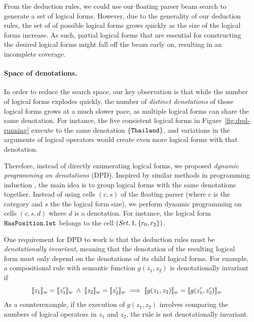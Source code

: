From the deduction rules,
we could use our floating parser beam search to generate a set
of logical forms.
However, due to the generality of our deduction rules,
the set of of possible logical forms grows quickly
as the size of the logical forms increase.
As such, partial logical forms that are essential for
constructing the desired logical forms might
fall off the beam early on, resulting in an incomplete coverage.

\paragraph{Space of denotations.}
In order to reduce the search space,
our key observation is that while the number of logical forms
explodes quickly,
the number of \emph{distinct denotations}
of those logical forms grows at a much slower pace,
as multiple logical forms can share the same denotation.
For instance, the five consistent logical forms in
Figure~\ref{fig:dpd-running}
execute to the same denotation $\left\{ \texttt{Thailand} \right\}$,
and variations in the arguments of logical operators
would create even more logical forms with that denotation.

Therefore, instead of directly enumerating logical forms,
we proposed \emph{dynamic programming on denotations} (DPD).
Inspired by similar methods in programming induction
\cite{lau03programming,liang10programs,gulwani2011automating,devlin2017robustfill},
the main idea is to group logical forms
with the same denotations together.
Instead of using cells $(c, s)$ of the floating parser
(where $c$ is the category and $s$ the the logical form size),
we perform dynamic programming on cells
$(c, s, d)$ where $d$ is a denotation.
For instance, the logical form
$\texttt{Has}{\texttt{Position}}.\texttt{1st}$
belongs to the cell $(\text{\emph{Set}}, 1, \left\{ r_0, r_2 \right\})$.

One requirement for DPD to work
is that the deduction rules
must be \emph{denotationally invariant},
meaning that the denotation of the resulting logical form
must only depend on the denotations of its child
logical forms.
For example, a compositional rule 
with semantic function $g(z_1, z_2)$
is denotationally invariant if
\begin{equation}
\llbracket{z_1}\rrbracket_{w} = \llbracket{z'_1}\rrbracket_{w} \;\wedge\;
\llbracket{z_2}\rrbracket_{w} = \llbracket{z'_2}\rrbracket_{w} \implies
\llbracket{g(z_1, z_2)}\rrbracket_{w} = \llbracket{g(z'_1, z'_2)}\rrbracket_{w}
\end{equation}
As a counterexample, if the execution of $g(z_1, z_2)$
involves comparing the numbers of logical operators
in $z_1$ and $z_2$,
the rule is not denotationally invariant.

